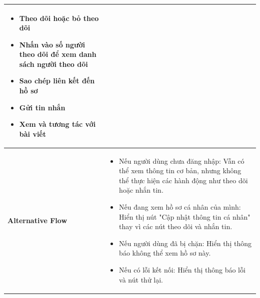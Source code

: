 \begin{longtable}{|>{\bfseries}m{4cm}|m{10cm}|}
\begin{enumerate}
       \begin{itemize}
         \item Theo dõi hoặc bỏ theo dõi
         \item Nhấn vào số người theo dõi để xem danh sách người theo dõi
         \item Sao chép liên kết đến hồ sơ
         \item Gửi tin nhắn
         \item Xem và tương tác với bài viết
       \end{itemize}
\end{enumerate} \\
\hline
Alternative Flow &
\begin{itemize}
    \item Nếu người dùng chưa đăng nhập: Vẫn có thể xem thông tin cơ bản, nhưng không thể thực hiện các hành động như theo dõi hoặc nhắn tin.
    \item Nếu đang xem hồ sơ cá nhân của mình: Hiển thị nút "Cập nhật thông tin cá nhân" thay vì các nút theo dõi và nhắn tin.
    \item Nếu người dùng đã bị chặn: Hiển thị thông báo không thể xem hồ sơ này.
    \item Nếu có lỗi kết nối: Hiển thị thông báo lỗi và nút thử lại.
\end{itemize} \\
\hline
\end{longtable}

